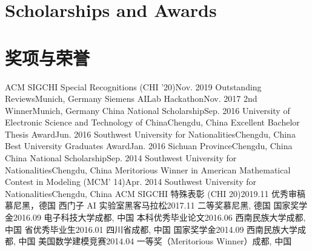 
 {
\section{\textbf{Scholarships and Awards}}
}{
\section{\textbf{奖项与荣誉}}
}
\resumeSubHeadingListStartNoLabel
{} {
    \resumeSubheading
        {ACM SIGCHI Special Recognitions (CHI '20)}{Nov. 2019}
        {Outstanding Reviews}{Munich, Germany}
    \resumeSubheading
        {Siemens AILab Hackathon}{Nov. 2017}
        {2nd Winner}{Munich, Germany}
    \resumeSubheading
        {China National Scholarship}{Sep. 2016}
        {University of Electronic Science and Technology of China}{Chengdu, China}
    \resumeSubheading
        {Excellent Bachelor Thesis Award}{Jun. 2016}
        {Southwest University for Nationalities}{Chengdu, China}
    \resumeSubheading
        {Best University Graduates Award}{Jan. 2016}
        {Sichuan Province}{Chengdu, China}
    \resumeSubheading
        {China National Scholarship}{Sep. 2014}
        {Southwest University for Nationalities}{Chengdu, China}
    \resumeSubheading
        {Meritorious Winner in American Mathematical Contest in Modeling (MCM' 14)}{Apr. 2014}
        {Southwest University for Nationalities}{Chengdu, China}
}{
    \resumeSubheading
        {ACM SIGCHI 特殊表彰 (CHI 20)}{2019.11}
        {优秀审稿}{慕尼黑，德国}
    \resumeSubheading
        {西门子 AI 实验室黑客马拉松}{2017.11}
        {二等奖}{慕尼黑, 德国}
    \resumeSubheading
        {国家奖学金}{2016.09}
        {电子科技大学}{成都, 中国}
    \resumeSubheading
        {本科优秀毕业论文}{2016.06}
        {西南民族大学}{成都, 中国}
    \resumeSubheading
        {省优秀毕业生}{2016.01}
        {四川省}{成都, 中国}
    \resumeSubheading
        {国家奖学金}{2014.09}
        {西南民族大学}{成都, 中国}
    \resumeSubheading
        {美国数学建模竞赛}{2014.04}
        {一等奖（Meritorious Winner）}{成都, 中国}
}
\resumeSubHeadingListEnd